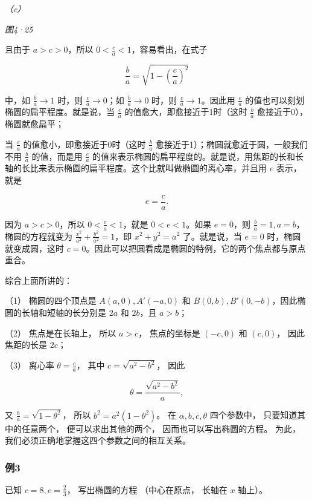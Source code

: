 \emph{（c）}

\emph{图4·25}

且由于 \(a > c > 0\)，所以 \(0 < \frac{c}{a} < 1\)，容易看出，在式子

\[
\frac {b}{a} = \sqrt {1 - \left(\frac {c}{a}\right) ^ {2}}
\]

中，如 \(\frac{b}{a} \to 1\) 时，则 \(\frac{c}{a} \to 0\)；如
\(\frac{b}{a} \to 0\) 时，则 \(\frac{c}{a} \to 1\)。因此用
\(\frac{c}{a}\) 的值也可以刻划椭圆的扁平程度。就是说，当 \(\frac{c}{a}\)
的值愈大，即愈接近于1时（这时 \(\frac{b}{a}\)
愈接近于0），椭圆就愈扁平；

当 \(\frac{c}{a}\) 的值愈小，即愈接近于0时（这时 \(\frac{b}{a}\)
愈接近于1）；椭圆就愈近于圆，一般我们不用 \(\frac{b}{a}\) 的值，而是用
\(\frac{c}{a}\)
的值来表示椭圆的扁平程度的。就是说，用焦距的长和长轴的长比来表示椭圆的扁平程度。这个比就叫做椭圆的离心率，并且用
\(e\) 表示，就是

\[
\boxed {e = \frac {c}{a}.}
\]

因为 \(a > c > 0\)，所以 \(0 < \frac{c}{a} < 1\)，就是
\(0 < e < 1\)。如果 \(e = 0\)，则
\(\frac{b}{a} = 1, a = b\)，椭圆的方程就变为
\(\frac{x^2}{a^2} + \frac{y^2}{a^2} = 1\)，即 \(x^2 + y^2 = a^2\)
了。就是说，当 \(e = 0\) 时，椭圆就变成圆，这时
\(c = 0\)。因此可以把圆看成是椭圆的特例，它的两个焦点都与原点重合。

综合上面所讲的：

（1） 椭圆的四个顶点是 \(A(a, 0), A'(-a, 0)\) 和
\(B(0, b), B'(0, -b)\)，因此椭圆的长轴和短轴的长分别是 \(2a\) 和
\(2b\)，且 \(a > b\)；

（2） 焦点是在长轴上， 所以 \(a > c\)， 焦点的坐标是 \((-c, 0)\) 和
\((c, 0)\)， 因此焦距的长是 \(2c\)；

（3） 离心率 \(\theta = \frac{c}{a}\)， 其中 \(c = \sqrt{a^2 - b^2}\)，
因此

\[
\theta = \frac {\sqrt {a^{2} - b^{2}}}{a},
\]

又 \(\frac{b}{a} = \sqrt{1 - \theta^2}\)， 所以
\(b^2 = a^2(1 - \theta^2)\)。 在 \(\alpha, b, c, \theta\) 四个参数中，
只要知道其中的任意两个， 便可以求出其他的两个，
因而也可以写出椭圆的方程。 为此，
我们必须正确地掌握这四个参数之间的相互关系。

\subsubsection{例3}\label{ux4f8b3-16}

已知 \(c = 8, e = \frac{2}{3}\)， 写出椭圆的方程 （中心在原点， 长轴在
\(x\) 轴上）。

